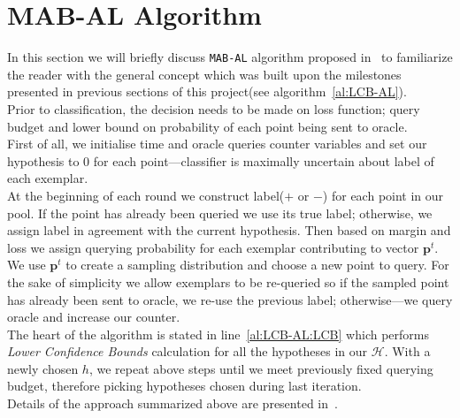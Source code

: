 \documentclass[12pt, a4paper, pdflatex, leqno, twoside]{report}
\begin{document}
\section{MAB-AL Algorithm}

In this section we will briefly discuss \texttt{MAB-AL} algorithm proposed 
in~\citep{DBLP:journals/corr/GantiG13} to familiarize the reader with the general 
concept which was built upon the milestones presented in previous sections of this project(see 
algorithm~\ref{al:LCB-AL}).\\

Prior to classification, the decision needs to be 
made on loss function; query budget and lower bound on probability of each 
point being sent to oracle.\\

First of all, we initialise time and oracle queries counter variables and set 
our hypothesis to $0$ for each point---classifier is maximally uncertain 
about label of each exemplar.\\

At the beginning of each round we construct label($+$ or $-$) for each point 
in our pool. If the point has already been queried we use its true label; otherwise, 
 we assign label in agreement with the current hypothesis. Then based on 
margin and loss we assign querying probability for each exemplar contributing 
to vector $\mathbf{p}^t$. We use $\mathbf{p}^t$ to create a sampling 
distribution and choose a new point to query. For the sake of simplicity we allow 
exemplars to be re-queried so if the sampled point has already been sent to 
oracle, we re-use the previous label; otherwise---we query oracle and increase our 
counter.\\

The heart of the algorithm is stated in line~\ref{al:LCB-AL:LCB} which performs 
\emph{Lower Confidence Bounds} calculation for all the hypotheses in our 
$\mathscr{H}$. With a newly chosen $h$, we repeat above steps until we meet 
previously fixed querying budget, therefore picking hypotheses chosen during last 
iteration.\\

Details of the approach summarized above are presented 
in~\citep{DBLP:journals/corr/GantiG13}.\\
\end{document}
